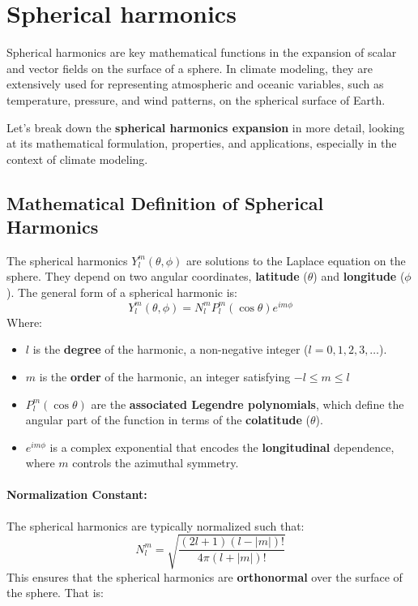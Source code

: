 \section{Spherical harmonics}
\label{sec:spherical-harmonics}

Spherical harmonics are key mathematical functions in the expansion of scalar and vector fields on the surface of a sphere. In climate modeling, they are extensively used for representing atmospheric and oceanic variables, such as temperature, pressure, and wind patterns, on the spherical surface of Earth.

Let's break down the \textbf{spherical harmonics expansion} in more detail, looking at its mathematical formulation, properties, and applications, especially in the context of climate modeling.

\subsection{Mathematical Definition of Spherical Harmonics}
\label{subsec:spherical-harmonics-def}

The spherical harmonics $Y_l^m(\theta, \phi)$ are solutions to the Laplace equation on the sphere. They depend on two angular coordinates, \textbf{latitude} ($\theta$) and \textbf{longitude} ($\phi$).
The general form of a spherical harmonic is:
\[Y_l^m(\theta,\phi)=N_l^m P_l^m(\cos\theta)e^{im\phi}\]
Where:
\begin{itemize}
	\item $l$ is the \textbf{degree} of the harmonic, a non-negative integer ($l=0,1,2,3,…$).
	\item  $m$ is the \textbf{order} of the harmonic, an integer satisfying $-l\leq m\leq l$
	\item $P_l^m(\cos\theta)$ are the \textbf{associated Legendre polynomials}, which define the angular part of the function in terms of the \textbf{colatitude} ($\theta$).
	\item $e^{im\phi}$ is a complex exponential that encodes the \textbf{longitudinal} dependence, where $m$ controls the azimuthal symmetry.
\end{itemize}

\paragraph{\textbf{Normalization Constant}:}

The spherical harmonics are typically normalized such that:
$$N_l^m=\sqrt{\frac{(2l+1)(l-|m|)!}{4\pi(l+|m|)!}}$$
This ensures that the spherical harmonics are \textbf{orthonormal} over the surface of the sphere. That is:


